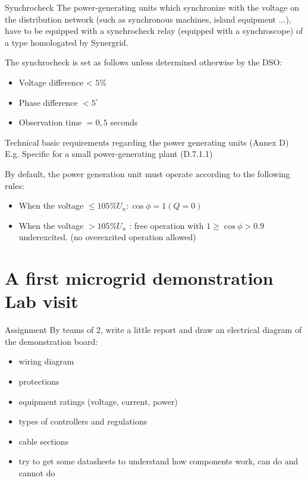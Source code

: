 \begin{frame}{Synchrocheck}
The power-generating units which synchronize with the voltage on the distribution network (such as synchronous machines, island equipment ...), have to be equipped with a synchrocheck relay (equipped with a synchroscope) of a type homologated by Synergrid.

The synchrocheck is set as follows unless determined otherwise by the DSO:

\begin{itemize}
  \item Voltage difference < $5 \%$
  \item Phase difference $<5^{\circ}$
  \item Observation time $=0,5$ seconds
\end{itemize}

\end{frame}

\begin{frame}{Technical basic requirements regarding the power generating units (Annex D)}
E.g. Specific for a small power-generating plant (D.7.1.1)

By default, the power generation unit must operate according to the following rules:

\begin{itemize}
  \item When the voltage $\leq 105 \% U_{n}: \cos \phi=1(Q=0)$
  \item When the voltage $>105 \% U_{n}$ : free operation with $1 \geq \cos \phi>0.9$ underexcited. (no overexcited operation allowed)
\end{itemize}
\end{frame}




\section{A first microgrid demonstration Lab visit}

\begin{frame}{Assignment}
By teams of 2, write a little report and draw an electrical diagram of the demonstration board:

\begin{itemize}
  \item wiring diagram
  \item protections
  \item equipment ratings (voltage, current, power)
  \item types of controllers and regulations
  \item cable sections
  \item try to get some datasheets to understand how components work, can do and cannot do
\end{itemize}
\end{frame}

